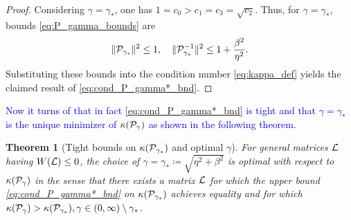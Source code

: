 \documentclass[a4paper,10pt]{article}
\newtheorem{theorem}{Theorem}
\newcommand{\tcb}{\textcolor{blue}}
\begin{document}
\begin{proof}
Considering $\gamma = \gamma_*$, one has $1 = c_0 > c_1 = c_3 = \sqrt{c_2}$. Thus, for $\gamma = \gamma_*$, bounds \eqref{eq:P_gamma_bounds} are
\begin{align}
\label{eq:P_gamma*_bounds}
\Vert {\cal P}_{\gamma_*} \Vert^2 \leq 1,
\quad
\Vert {\cal P}_{\gamma_*}^{-1} \Vert^2 \leq 1 + \frac{\beta^2}{\eta^2}.
\end{align}
Substituting these bounds into the condition number \eqref{eq:kappa_def} yields the claimed result of \eqref{eq:cond_P_gamma*_bnd}.
\end{proof}

\tcb{
Now it turns of that in fact \eqref{eq:cond_P_gamma*_bnd} is tight and that $\gamma = \gamma_*$ is the unique minimizer of $\kappa({\cal P}_{\gamma})$ as shown in the following theorem.
}

\begin{theorem}[Tight bounds on $\kappa({\cal P}_{\gamma_*})$ and optimal $\gamma$]
\label{th:tight_bound_P_gamma*}
For general matrices ${\cal L}$ having $W({\cal L}) \leq 0$, the choice of $\gamma = \gamma_* \coloneqq \sqrt{\eta^2 + \beta^2}$ is optimal with respect to $\kappa({\cal P}_{\gamma})$ in the sense that there exists a matrix ${\cal L}$ for which the upper bound \eqref{eq:cond_P_gamma*_bnd} on $\kappa({\cal P}_{\gamma_*})$ achieves equality and for which $\kappa({\cal P}_{\gamma}) > \kappa({\cal P}_{\gamma_*}), \gamma \in (0, \infty) \setminus \gamma_*$.
\end{theorem}
\end{document}
